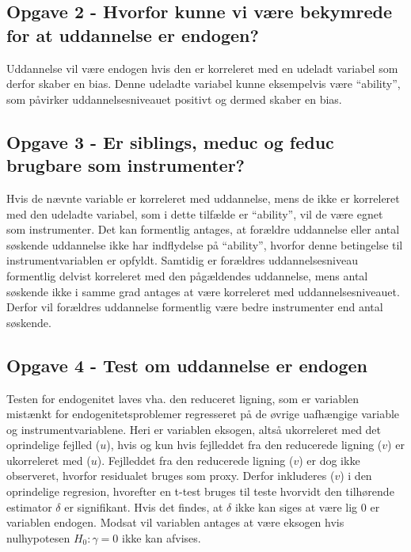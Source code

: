 \documentclass[
]{article}
\begin{document}
\hypertarget{opgave-2---hvorfor-kunne-vi-vuxe6re-bekymrede-for-at-uddannelse-er-endogen}{%
\subsection{Opgave 2 - Hvorfor kunne vi være bekymrede for at uddannelse
er
endogen?}\label{opgave-2---hvorfor-kunne-vi-vuxe6re-bekymrede-for-at-uddannelse-er-endogen}}

Uddannelse vil være endogen hvis den er korreleret med en udeladt
variabel som derfor skaber en bias. Denne udeladte variabel kunne
eksempelvis være ``ability'', som påvirker uddannelsesniveauet positivt
og dermed skaber en bias.

\hypertarget{opgave-3---er-siblings-meduc-og-feduc-brugbare-som-instrumenter}{%
\subsection{Opgave 3 - Er siblings, meduc og feduc brugbare som
instrumenter?}\label{opgave-3---er-siblings-meduc-og-feduc-brugbare-som-instrumenter}}

Hvis de nævnte variable er korreleret med uddannelse, mens de ikke er
korreleret med den udeladte variabel, som i dette tilfælde er
``ability'', vil de være egnet som instrumenter. Det kan formentlig
antages, at forældre uddannelse eller antal søskende uddannelse ikke har
indflydelse på ``ability'', hvorfor denne betingelse til
instrumentvariablen er opfyldt. Samtidig er forældres uddannelsesniveau
formentlig delvist korreleret med den pågældendes uddannelse, mens antal
søskende ikke i samme grad antages at være korreleret med
uddannelsesniveauet. Derfor vil forældres uddannelse formentlig være
bedre instrumenter end antal søskende.

\hypertarget{opgave-4---test-om-uddannelse-er-endogen}{%
\subsection{Opgave 4 - Test om uddannelse er
endogen}\label{opgave-4---test-om-uddannelse-er-endogen}}

Testen for endogenitet laves vha. den reduceret ligning, som er
variablen mistænkt for endogenitetsproblemer regresseret på de øvrige
uafhængige variable og instrumentvariablene. Heri er variablen eksogen,
altså ukorreleret med det oprindelige fejlled (\(u\)), hvis og kun hvis
fejlleddet fra den reducerede ligning (\(v\)) er ukorreleret med
(\(u\)). Fejlleddet fra den reducerede ligning (\(v\)) er dog ikke
observeret, hvorfor residualet bruges som proxy. Derfor inkluderes
(\(v\)) i den oprindelige regresion, hvorefter en t-test bruges til
teste hvorvidt den tilhørende estimator \(\delta\) er signifikant. Hvis
det findes, at \(\delta\) ikke kan siges at være lig 0 er variablen
endogen. Modsat vil variablen antages at være eksogen hvis nulhypotesen
\(H_0: \gamma = 0\) ikke kan afvises.
\end{document}
